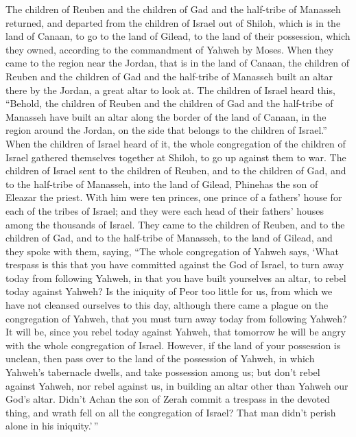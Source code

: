  The children of Reuben and the children of Gad and the
half-tribe of Manasseh returned, and departed from the children of
Israel out of Shiloh, which is in the land of Canaan, to go to the land
of Gilead, to the land of their possession, which they owned, according
to the commandment of Yahweh by Moses.  When they came to
the region near the Jordan, that is in the land of Canaan, the children
of Reuben and the children of Gad and the half-tribe of Manasseh built
an altar there by the Jordan, a great altar to look at. 
The children of Israel heard this, ``Behold, the children of Reuben and
the children of Gad and the half-tribe of Manasseh have built an altar
along the border of the land of Canaan, in the region around the Jordan,
on the side that belongs to the children of Israel.''  When
the children of Israel heard of it, the whole congregation of the
children of Israel gathered themselves together at Shiloh, to go up
against them to war.  The children of Israel sent to the
children of Reuben, and to the children of Gad, and to the half-tribe of
Manasseh, into the land of Gilead, Phinehas the son of Eleazar the
priest.  With him were ten princes, one prince of a
fathers' house for each of the tribes of Israel; and they were each head
of their fathers' houses among the thousands of Israel. 
They came to the children of Reuben, and to the children of Gad, and to
the half-tribe of Manasseh, to the land of Gilead, and they spoke with
them, saying,  ``The whole congregation of Yahweh says,
`What trespass is this that you have committed against the God of
Israel, to turn away today from following Yahweh, in that you have built
yourselves an altar, to rebel today against Yahweh?  Is the
iniquity of Peor too little for us, from which we have not cleansed
ourselves to this day, although there came a plague on the congregation
of Yahweh,  that you must turn away today from following
Yahweh? It will be, since you rebel today against Yahweh, that tomorrow
he will be angry with the whole congregation of Israel. 
However, if the land of your possession is unclean, then pass over to
the land of the possession of Yahweh, in which Yahweh's tabernacle
dwells, and take possession among us; but don't rebel against Yahweh,
nor rebel against us, in building an altar other than Yahweh our God's
altar.  Didn't Achan the son of Zerah commit a trespass in
the devoted thing, and wrath fell on all the congregation of Israel?
That man didn't perish alone in his iniquity.'\,''

